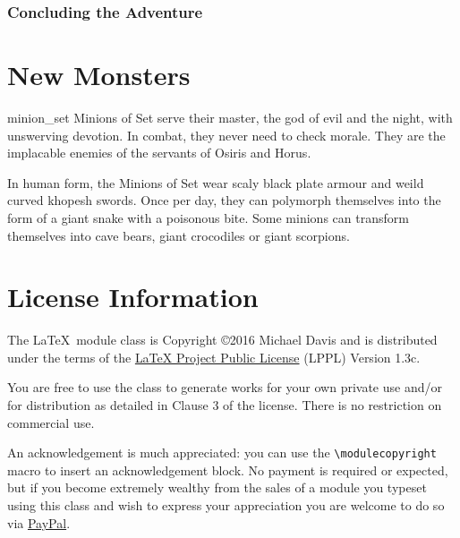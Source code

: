 \documentclass[a4paper,serif]{module}
\begin{document}
\noindent\lipsum[12-14]

\section{Concluding the Adventure}

\lipsum[12-13]

\newpage

%
%

\part{New Monsters}


\begin{newmonster}{minion_set}\label{minion_set}%
Minions of Set serve their master, the god of evil and the night, with unswerving devotion. In combat, they
never need to check morale. They are the implacable enemies of the servants of Osiris and Horus.

In human form, the Minions of Set wear scaly black plate armour and weild curved khopesh swords. Once per
day, they can polymorph themselves into the form of a giant snake with a poisonous bite. Some minions can
transform themselves into cave bears, giant crocodiles or giant scorpions.
\end{newmonster}

\part{License Information}

The \LaTeX~module class is Copyright \copyright 2016 Michael Davis and is distributed under the terms of the
\href{http://www.latex-project.org/lppl.txt}{LaTeX Project Public License} (LPPL) Version 1.3c.

You are free to use the class to generate works for your own private use and/or for distribution as detailed in
Clause 3 of the license. There is no restriction on commercial use.

An acknowledgement is much appreciated: you can use the \verb|\modulecopyright| macro to insert an acknowledgement
block. No payment is required or expected, but if you become extremely wealthy from the sales of a module
you typeset using this class and wish to express your appreciation you are welcome to do so via
\href{https://paypal.me/slithy}{PayPal}.
\end{document}
